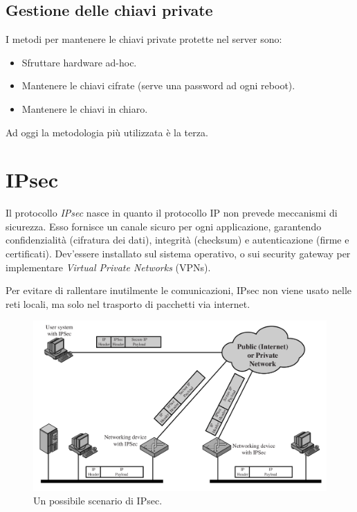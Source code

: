 \documentclass[a4paper, 11pt, notitlepage, fleqn]{report}
\begin{document}
\subsection{Gestione delle chiavi private}
I metodi per mantenere le chiavi private protette nel server sono:
\begin{itemize}
	\item Sfruttare hardware ad-hoc.
	\item Mantenere le chiavi cifrate (serve una password ad ogni reboot).
	\item Mantenere le chiavi in chiaro.
\end{itemize}
Ad oggi la metodologia più utilizzata è la terza.

\section{IPsec}
Il protocollo \emph{IPsec} nasce in quanto il protocollo IP non prevede meccanismi di sicurezza. Esso fornisce un canale sicuro per ogni applicazione, garantendo confidenzialità (cifratura dei dati), integrità (checksum) e autenticazione (firme e certificati). Dev'essere installato sul sistema operativo, o sui security gateway per implementare \emph{Virtual Private Networks} (VPNs).

Per evitare di rallentare inutilmente le comunicazioni, IPsec non viene usato nelle reti locali, ma solo nel trasporto di pacchetti via internet.
\begin{figure}[htp]
	\centering
	\includegraphics[width=\textwidth]{images/IPsecScenario}
	\caption{Un possibile scenario di IPsec.}
\end{figure}
\end{document}
